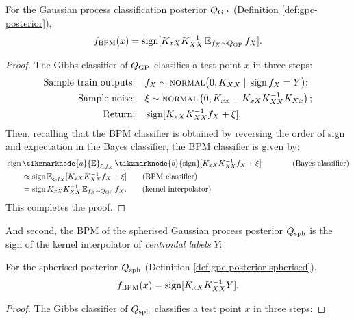 \begin{refsection}
\begin{lemma}\label{lem:gpc-bpm} For the Gaussian process classification posterior $Q_\mathrm{GP}$ (Definition \ref{def:gpc-posterior}),
\begin{equation}
    f_{\mathrm{BPM}}(x) = \operatorname{sign} [K_{xX} K_{XX}^{-1} \operatorname{\mathbb{E}}_{f_X\sim Q_\mathrm{GP}}f_X ].
\end{equation}
\end{lemma}
\begin{proof}
The Gibbs classifier of $Q_\mathrm{GP}$ classifies a test point $x$ in three steps:
\begin{align*}
\text{Sample train outputs:}\quad &f_X \sim \textsc{normal}\big(0,K_{XX} \;|\; \operatorname{sign} f_X = Y \big);\\
\text{Sample noise:}\quad &\xi \sim \textsc{normal}\left(0, K_{xx} - K_{xX}K_{XX}^{-1} K_{Xx}\right);\\
\text{Return:}\quad &\operatorname{sign} [K_{xX} K_{XX}^{-1} f_X + \xi ].
\end{align*}
Then, recalling that the BPM classifier is obtained by reversing the order of sign and expectation in the Bayes classifier, the BPM classifier is given by:
\begin{align*}
	&\sign \tikzmarknode{a}{\Expect}_{\xi,f_X}\,\tikzmarknode{b}{\sign} [K_{xX} K_{XX}^{-1} f_X + \xi ] \qquad \tag{Bayes classifier}\\
	&\qquad\approx\sign \Expect_{\xi,f_X} [K_{xX} K_{XX}^{-1} f_X + \xi ]\tag{BPM classifier}\\
	&\qquad=\sign K_{xX} K_{XX}^{-1} \Expect_{f_X\sim \qgp}f_X. \tag{kernel interpolator}
\end{align*}
%
This completes the proof.
\end{proof}
And second, the BPM of the spherised Gaussian process posterior $Q_\mathrm{sph}$ is the sign of the kernel interpolator of \textit{centroidal labels} $Y$:
\begin{lemma}\label{lem:gpc-spherised-bpm} For the spherised posterior $Q_\mathrm{sph}$ (Definition \ref{def:gpc-posterior-spherised}),
\begin{equation}
    f_{\mathrm{BPM}}(x) = \operatorname{sign} [K_{xX} K_{XX}^{-1} Y ].
\end{equation}
\end{lemma}
\begin{proof}
The Gibbs classifier of $Q_\mathrm{sph}$ classifies a test point $x$ in three steps:

\end{proof}
\end{refsection}
